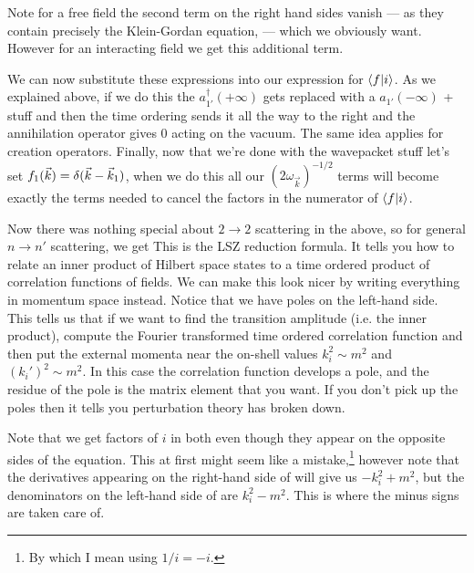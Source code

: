 \br 
    Note for a free field the second term on the right hand sides vanish --- as they contain precisely the Klein-Gordan equation,  --- which we obviously want. However for an interacting field we get this additional term. 
\er 

We can now substitute these expressions into our expression for $\braket{f}{i}$. As we explained above, if we do this the $a_{1'}^{\dagger}(+\infty)$ gets replaced with a $a_{1'}(-\infty)$ + stuff and then the time ordering sends it all the way to the right and the annihilation operator gives $0$ acting on the vacuum. The same idea applies for creation operators. Finally, now that we're done with the wavepacket stuff let's set $f_1(\vec{k}) = \delta(\vec{k}-\vec{k}_1)$, when we do this all our $(2\omega_{\vec{k}})^{-1/2}$ terms will become exactly the terms needed to cancel the factors in the numerator of $\braket{f}{i}$.

Now there was nothing special about $2\to2$ scattering in the above, so for general $n\to n'$ scattering, we get 
\noindent This is the LSZ reduction formula. It tells you how to relate an inner product of Hilbert space states to a time ordered product of correlation functions of fields. We can make this look nicer by writing everything in momentum space instead. 
Notice that we have poles on the left-hand side. This tells us that if we want to find the transition amplitude (i.e. the inner product), compute the Fourier transformed time ordered correlation function and then put the external momenta near the on-shell values $k_i^2 \sim m^2$ and $(k_i')^2\sim m^2$. In this case the correlation function develops a pole, and the residue of the pole is the matrix element that you want. If you don't pick up the poles then it tells you perturbation theory has broken down. 

\br 
    Note that we get factors of $i$ in both  even though they appear on the opposite sides of the equation. This at first might seem like a mistake,\footnote{By which I mean using $1/i = -i$.} however note that the derivatives appearing on the right-hand side of  will give us $-k_i^2+m^2$, but the denominators on the left-hand side of  are $k_i^2-m^2$. This is where the minus signs are taken care of. 
\er 

